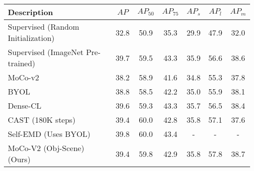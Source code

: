 






\begin{table*}
    \centering
    \begin{tabu} to \linewidth {lcccccc} 
        \toprule
        Description & $AP$ & $AP_{50}$ & $AP_{75}$ & $AP_{s}$ & $AP_{l}$ & $AP_{m}$ \\
         \midrule
    Supervised (Random Initialization) & 32.8 & 50.9 & 35.3 & 29.9 & 47.9 & 32.0 \\
    Supervised (ImageNet Pre-trained) & 39.7 & 59.5 & 43.3 & 35.9 & 56.6 & 38.6 \\
     \midrule
    MoCo-v2 \citep{chen2020improved}  & 38.2 & 58.9 & 41.6 & 34.8 & 55.3 & 37.8\\
    BYOL \citep{henaff2021efficient}  & 38.8 & 58.5 & 42.2 & 35.0 & 55.9& 38.1\\
    Dense-CL \citep{wang2021dense} & 39.6 & 59.3 & 43.3 & 35.7 & 56.5 & 38.4 \\
    CAST \citep{selvaraju2020casting} (180K steps) & 39.4 &  60.0 & 42.8 & 35.8 & 57.1 & 37.6 \\ 
    Self-EMD \citep{liu2021selfemd} (Uses BYOL)  & 39.8 & 60.0 & 43.4 & - & -& -\\
    \midrule
    MoCo-V2 (Obj-Scene) (Ours)  & 39.4 & 59.8 & 42.9 & 35.8 & 57.8 & 38.7\\
     
   
    

\end{tabu}
\end{table*}
